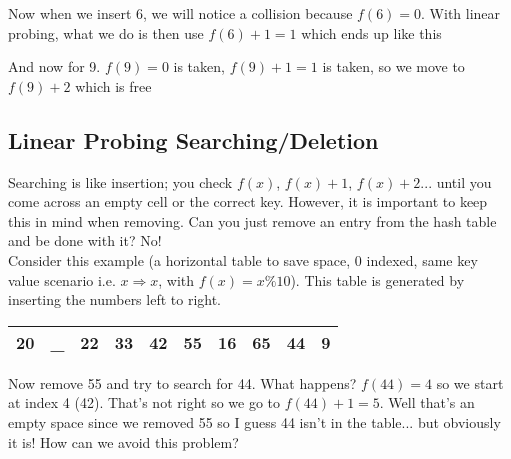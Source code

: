\documentclass[11pt]{book}
\begin{document}
		\noindent Now when we insert 6, we will notice a collision because $f(6) = 0$.
		With linear probing, what we do is then use $f(6) + 1 = 1$ which ends up like this

		\begin{center}
		\end{center}

		\noindent And now for 9. $f(9) = 0$ is taken, $f(9) + 1 = 1$ is taken, so we move
		to $f(9) + 2$ which is free

		\begin{center}
		\end{center}

	\subsection{Linear Probing Searching/Deletion}
		Searching is like insertion; you check $f(x)$, $f(x) + 1$, $f(x) + 2$... until you
		come across an empty cell or the correct key. However, it is important to keep
		this in mind when removing. Can you just remove an entry from the hash table
		and be done with it? No!\\

		\noindent Consider this example (a horizontal table to save space, 0 indexed,
		same key value scenario i.e. $x \Rightarrow x$, with $f(x) = x \% 10$). This
		table is generated by inserting the numbers left to right.
		\begin{center}
			\begin{tabular}{|c|c|c|c|c|c|c|c|c|c|}
				\hline
				20 & \_ & 22 & 33 & 42 & 55 & 16 & 65 & 44 & 9 \\
				\hline
			\end{tabular}
		\end{center}
		\noindent Now remove 55 and try to search for 44. What happens? $f(44) = 4$ so
		we start at index 4 (42). That's not right so we go to $f(44) + 1 = 5$. Well
		that's an empty space since we removed 55 so I guess 44 isn't in the table...
		but obviously it is! How can we avoid this problem? \\
\end{document}
